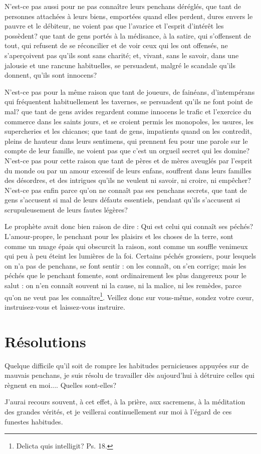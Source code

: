 \documentclass[instructions.tex]{subfiles}
\begin{document}
N'est-ce pas aussi pour ne pas connaître leurs penchans déréglés, que tant de personnes attachées à leurs biens, emportées quand elles perdent, dures envers le pauvre et le débiteur, ne voient pas que l'avarice et l'esprit d'intérêt les possèdent? que tant de gens portés à la médisance, à la satire, qui s'offensent de tout, qui refusent de se réconcilier et de voir ceux qui les ont offensés, ne s'aperçoivent pas qu'ils sont sans charité; et, vivant, sans le savoir, dans une jalousie et une rancune habituelles, se persuadent, malgré le scandale qu'ils donnent, qu'ils sont innocens?

N'est-ce pas pour la même raison que tant de joueurs, de fainéans, d'intempérans qui fréquentent habituellement les tavernes, se persuadent qu'ils ne font point de mal? que tant de gens avides regardent comme innocens le trafic et l'exercice du commerce dans les saints jours, et se croient permis les monopoles, les usures, les supercheries et les chicanes; que tant de gens, impatients quand on les contredit, pleins de hauteur dans leurs sentimens, qui prennent feu pour une parole sur le compte de leur famille, ne voient pas que c'est un orgueil secret qui les domine? N'est-ce pas pour cette raison que tant de pères et de mères aveuglés par l'esprit du monde ou par un amour excessif de leurs enfans, souffrent dans leurs familles des désordres, et des intrigues qu'ils ne veulent ni savoir, ni croire, ni empêcher? N'est-ce pas enfin parce qu'on ne connaît pas ses penchans secrets, que tant de gens s'accusent si mal de leurs défauts essentiels, pendant qu'ils s'accusent si scrupuleusement de leurs fautes légères?

Le prophète avait donc bien raison de dire : Qui est celui qui connaît ses péchés? L'amour-propre, le penchant pour les plaisirs et les choses de la terre, sont comme un nuage épais qui obscurcit la raison, sont comme un souffle venimeux qui peu à peu éteint les lumières de la foi. Certains péchés grossiers, pour lesquels on n'a pas de penchans, se font sentir : on les connaît, on s'en corrige; mais les péchés que le penchant fomente, sont ordinairement les plus dangereux pour le salut : on n'en connaît souvent ni la cause, ni la malice, ni les remèdes, parce qu'on ne veut pas les connaître\footnote{Delicta quis intelligit? Ps. 18.}. Veillez donc sur vous-même, sondez votre cœur, instruisez-vous et laissez-vous instruire.


\section{Résolutions}

\primo Quelque difficile qu'il soit de rompre les habitudes pernicieuses appuyées sur de mauvais penchans, je suis résolu de travailler dès aujourd'hui à détruire celles qui règnent en moi.... Quelles sont-elles?

\secundo J'aurai recours souvent, à cet effet, à la prière, aux sacremens, à la méditation des grandes vérités, et je veillerai continuellement sur moi à l'égard de ces funestes habitudes.

\end{document}
